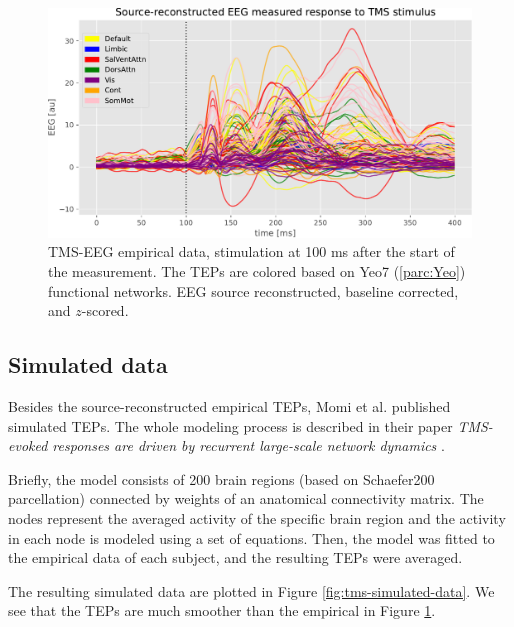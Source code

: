 \begin{figure}
    \centering
    \includegraphics[width=\textwidth]{images/nootebook_generated/pytepfit_results/empirical/200/not_over_threshold_nan/data.pdf}
    \caption[TMS-EEG empirical data]{TMS-EEG empirical data, stimulation at 100 ms after the start of the measurement. The TEPs are colored based on Yeo7 (\ref{parc:Yeo}) functional networks. EEG source reconstructed, baseline corrected, and $z$-scored.}
    \label{fig:tms-empirical-data}
\end{figure}

\subsection{Simulated data}

Besides the source-reconstructed empirical TEPs, Momi et al. published simulated TEPs. The whole modeling process is described in their paper \textit{TMS-evoked responses are driven by recurrent large-scale network dynamics} \cite{momi_tms-evoked_2023}. 

Briefly, the model consists of 200 brain regions (based on Schaefer200 parcellation) connected by weights of an anatomical connectivity matrix. The nodes represent the averaged activity of the specific brain region and the activity in each node is modeled using a set of equations. \cite{deco_perturbation_2018} Then, the model was fitted to the empirical data of each subject, and the resulting TEPs were averaged. \cite{momi_tms-evoked_2023}

The resulting simulated data are plotted in Figure \ref{fig:tms-simulated-data}. We see that the TEPs are much smoother than the empirical in Figure \ref{fig:tms-empirical-data}.

